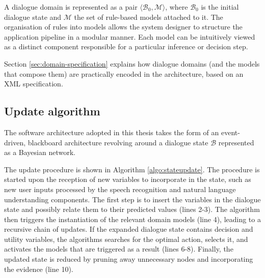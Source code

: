 A dialogue domain is represented as a pair $\langle \mathcal{B}_0, \mathcal{M} \rangle$, where $\mathcal{B}_0$ is the initial dialogue state  and $\mathcal{M}$ the set of rule-based models attached to it. The organisation of rules into models allows the system designer to structure the application pipeline in a modular manner. Each model can be intuitively viewed as a distinct component responsible for a particular inference or decision step. 

Section \ref{sec:domain-specification} explains how dialogue domains (and the models that compose them) are practically encoded in the \opendial architecture, based on an XML specification. 

\subsection{Update algorithm} 

The software architecture adopted in this thesis takes the form of an event-driven, blackboard architecture revolving around a dialogue state $\mathcal{B}$ represented as a Bayesian network.  %

The update procedure is shown in Algorithm \ref{algo:stateupdate}. The procedure is started upon the reception of new variables to incorporate in the state, such as new user inputs processed by the speech recognition and natural language understanding components. The first step is to insert the variables in the dialogue state and possibly relate them to their predicted values (lines 2-3). The algorithm then triggers the instantiation of the relevant domain models (line 4), leading to a recursive chain of updates.  If the expanded dialogue state contains decision and utility variables, the algorithms searches for the optimal action, selects it, and activates the models that are triggered as a result  (lines 6-8). Finally, the updated state is reduced by pruning away unnecessary nodes and incorporating the evidence (line 10). 


